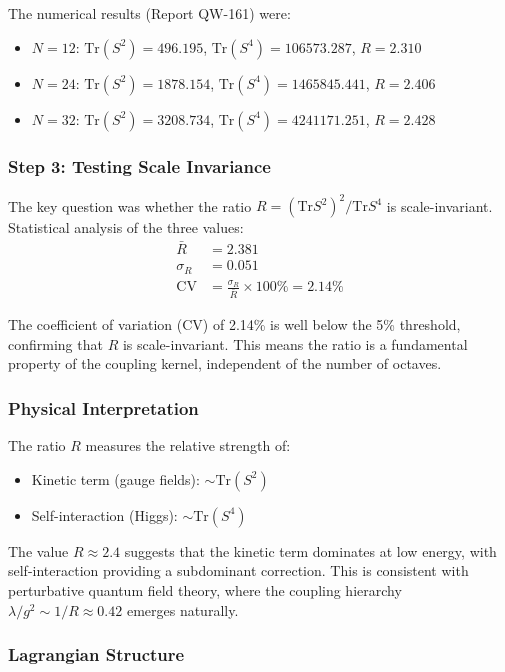 \documentclass[11pt, a4paper]{article}
\begin{document}
The numerical results (Report QW-161) were:
\begin{itemize}
    \item $N = 12$: $\text{Tr}(S^2) = 496.195$, $\text{Tr}(S^4) = 106573.287$, $R = 2.310$
    \item $N = 24$: $\text{Tr}(S^2) = 1878.154$, $\text{Tr}(S^4) = 1465845.441$, $R = 2.406$
    \item $N = 32$: $\text{Tr}(S^2) = 3208.734$, $\text{Tr}(S^4) = 4241171.251$, $R = 2.428$
\end{itemize}

\subsubsection{Step 3: Testing Scale Invariance}

The key question was whether the ratio $R = (\text{Tr} S^2)^2 / \text{Tr} S^4$ is scale-invariant. Statistical analysis of the three values:
\begin{align}
\bar{R} &= 2.381\\
\sigma_R &= 0.051\\
\text{CV} &= \frac{\sigma_R}{\bar{R}} \times 100\% = 2.14\%
\end{align}

The coefficient of variation (CV) of 2.14\% is well below the 5\% threshold, confirming that $R$ is scale-invariant. This means the ratio is a fundamental property of the coupling kernel, independent of the number of octaves.

\subsubsection{Physical Interpretation}

The ratio $R$ measures the relative strength of:
\begin{itemize}
    \item Kinetic term (gauge fields): $\sim \text{Tr}(S^2)$
    \item Self-interaction (Higgs): $\sim \text{Tr}(S^4)$
\end{itemize}

The value $R \approx 2.4$ suggests that the kinetic term dominates at low energy, with self-interaction providing a subdominant correction. This is consistent with perturbative quantum field theory, where the coupling hierarchy $\lambda/g^2 \sim 1/R \approx 0.42$ emerges naturally.

\subsubsection{Lagrangian Structure}
\end{document}
